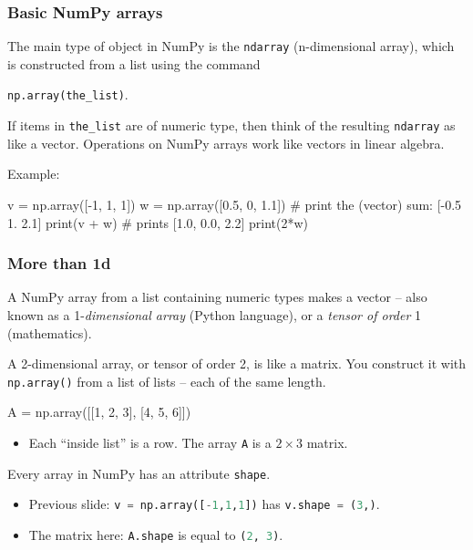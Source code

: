 \documentclass{beamer}
\newenvironment{codeblock}
    {\hfill\begin{beamerboxesrounded}[lower=codecol, width=0.8\textwidth]
    \medskip

    }
    { 
    \end{beamerboxesrounded}\hfill
    }
\theoremstyle{example}
\newcommand{\ct}[1]{\lstinline[language=Python,basicstyle=\ttfamily\footnotesize,stringstyle=\small\color{strings}]!#1!}
\newcommand{\ttt}[1]{{\small\texttt{#1}}}
\begin{document}
\begin{frame}[fragile]
\frametitle{Basic NumPy arrays}
The main type of object in NumPy is the \ct{ndarray} (n-dimensional array), which is constructed from a list using the command 
\begin{center}\ct{np.array(the_list)}.\end{center}

\vspace*{12pt}
\pause
If items in \ct{the_list} are of numeric type, then think of the resulting \ct{ndarray} as like a vector. Operations on NumPy arrays work like vectors in linear algebra.

\pause
Example:

\begin{codeblock}

\begin{python}
v = np.array([-1, 1, 1])
w = np.array([0.5, 0, 1.1])
# print the (vector) sum: [-0.5  1.   2.1]
print(v + w)
# prints [1.0, 0.0, 2.2]
print(2*w)
\end{python}

\end{codeblock}

\vfill
\end{frame}

\begin{frame}[fragile]
\frametitle{More than {\ttm 1d}}
A NumPy array from a list containing numeric types makes a vector {--} also known as a 1-\emph{dimensional array} (Python language), or a \emph{tensor of order} 1 (mathematics). 

\pause
A 2-dimensional array, or tensor of order 2, is like a matrix. You construct it with \ct{np.array()} from a list of lists {--} each of the same length.

\begin{codeblock}

\begin{python}[numbers=none]
A = np.array([[1, 2, 3], [4, 5, 6]])
\end{python}

\end{codeblock}

\begin{itemize}
    \item[] Each ``inside list'' is a row. The array \ttt{A} is a $2\times 3$ matrix.
\end{itemize}

\pause
Every array in NumPy has an attribute \ct{shape}. 
\begin{itemize}
    \item Previous slide: \ct{v = np.array([-1,1,1])} has \ct{v.shape = (3,)}. 
    \item The matrix here: \ct{A.shape} is equal to \ct{(2, 3)}.
\end{itemize}
\end{frame}
\end{document}
